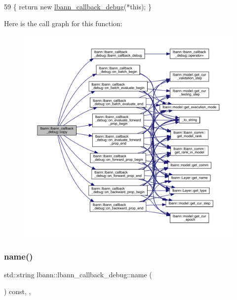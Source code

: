 \begin{DoxyCode}
59 \{ \textcolor{keywordflow}{return} \textcolor{keyword}{new} \hyperlink{classlbann_1_1lbann__callback__debug_a775f2f407573526795a9b7ffc7bd3ded}{lbann\_callback\_debug}(*\textcolor{keyword}{this}); \}
\end{DoxyCode}
Here is the call graph for this function\+:\nopagebreak
\begin{figure}[H]
\begin{center}
\leavevmode
\includegraphics[width=350pt]{classlbann_1_1lbann__callback__debug_a76ffcfb7aca5ccce132ceae60e267472_cgraph}
\end{center}
\end{figure}
\mbox{\label{classlbann_1_1lbann__callback__debug_ae9e892671f4959cfc915e1662afd6d60}} 
\subsubsection{\texorpdfstring{name()}{name()}}
{\footnotesize\ttfamily std\+::string lbann\+::lbann\+\_\+callback\+\_\+debug\+::name (\begin{DoxyParamCaption}{ }\end{DoxyParamCaption}) const\hspace{0.3cm}{\ttfamily [inline]}, {\ttfamily [override]}, {\ttfamily [virtual]}}

